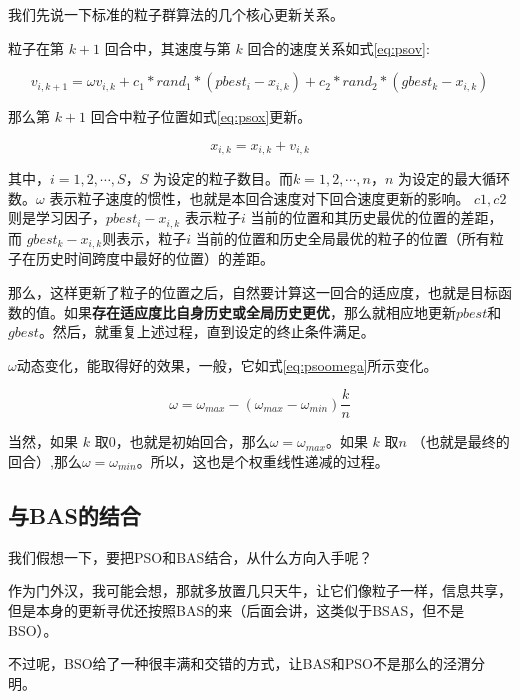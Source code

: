 \documentclass[]{ctexbook}
\theoremstyle{definition}
\theoremstyle{definition}
\theoremstyle{definition}
\theoremstyle{remark}
\begin{document}
我们先说一下标准的粒子群算法的几个核心更新关系。

粒子在第 \(k+1\) 回合中，其速度与第 \(k\)
回合的速度关系如式\eqref{eq:psov}:

\begin{equation}
v_{i,k+1} = \omega v_{i,k} + c_1*rand_1*(pbest_i-x_{i,k})+c_2*rand_2*(gbest_k-x_{i,k})
\label{eq:psov}
\end{equation}

那么第 \(k+1\) 回合中粒子位置如式\eqref{eq:psox}更新。

\begin{equation}
x_{i,k} = x_{i,k} + v_{i,k}
\label{eq:psox}
\end{equation}

其中，\(i=1,2,\cdots,S\)，\(S\)
为设定的粒子数目。而\(k=1,2,\cdots,n\)，\(n\)
为设定的最大循环数。\(\omega\)
表示粒子速度的惯性，也就是本回合速度对下回合速度更新的影响。
\(c1,c2\)则是学习因子，\(pbest_i-x_{i,k}\) 表示粒子\(i\)
当前的位置和其历史最优的位置的差距，而
\(gbest_k-x_{i,k}\)则表示，粒子\(i\)
当前的位置和历史全局最优的粒子的位置（所有粒子在历史时间跨度中最好的位置）的差距。

那么，这样更新了粒子的位置之后，自然要计算这一回合的适应度，也就是目标函数的值。如果\textbf{存在适应度比自身历史或全局历史更优}，那么就相应地更新\(pbest\)和\(gbest\)。然后，就重复上述过程，直到设定的终止条件满足。

\(\omega\)动态变化，能取得好的效果，一般，它如式\eqref{eq:psoomega}所示变化。

\begin{equation}
\omega = \omega_{max} - (\omega_{max}-\omega_{min})\frac{k}{n}
\label{eq:psoomega}
\end{equation}

当然，如果 \(k\)
取0，也就是初始回合，那么\(\omega = \omega_{max}\)。如果 \(k\) 取\(n\)
（也就是最终的回合）,那么\(\omega = \omega_{min}\)。所以，这也是个权重线性递减的过程。

\subsection{与BAS的结合}\label{bas}

我们假想一下，要把PSO和BAS结合，从什么方向入手呢？

作为门外汉，我可能会想，那就多放置几只天牛，让它们像粒子一样，信息共享，但是本身的更新寻优还按照BAS的来（后面会讲，这类似于BSAS，但不是BSO）。

不过呢，BSO给了一种很丰满和交错的方式，让BAS和PSO不是那么的泾渭分明。
\end{document}
